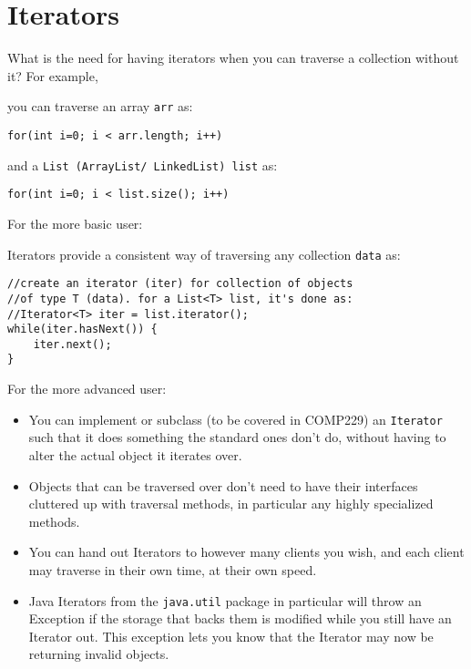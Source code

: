 \section*{Iterators}
\begin{questions}
\question What is the need for having iterators when you can traverse a collection without it? For example, 

you can traverse an array \texttt{arr} as:

\begin{lstlisting}[numbers=none]
for(int i=0; i < arr.length; i++)
\end{lstlisting} 

and a \texttt{List (ArrayList/ LinkedList) list} as:

\begin{lstlisting}
for(int i=0; i < list.size(); i++)
\end{lstlisting} 

\ifprintanswers
For the more basic user:

Iterators provide a consistent way of traversing any collection \texttt{data} as:

\begin{lstlisting}
//create an iterator (iter) for collection of objects
//of type T (data). for a List<T> list, it's done as:
//Iterator<T> iter = list.iterator();
while(iter.hasNext()) {
	iter.next();
}
\end{lstlisting}

For the more advanced user:

\begin{itemize}
  \item You can implement or subclass (to be covered in COMP229) an \texttt{Iterator} such that it does something the standard ones don't do, without having to alter the actual object it iterates over.
  \item Objects that can be traversed over don't need to have their interfaces cluttered up with traversal methods, in particular any highly specialized methods.
  \item You can hand out Iterators to however many clients you wish, and each client may traverse in their own time, at their own speed.
  \item Java Iterators from the \texttt{java.util} package in particular will throw an Exception if the storage that backs them is modified while you still have an Iterator out. This exception lets you know that the Iterator may now be returning invalid objects.
\end{itemize}
\else
\fi


\end{questions}
